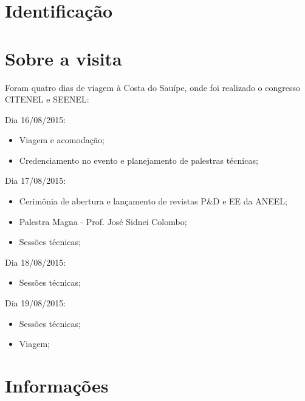 \documentclass[12pt,a4paper]{article}
\begin{document}



\newpage%
\section{Identificação}



\newpage%
\section{Sobre a visita}
Foram quatro dias de viagem à Costa do Sauípe, onde foi realizado o congresso
CITENEL e SEENEL:

Dia 16/08/2015:
\begin{itemize}
  \item Viagem e acomodação;
  \item Credenciamento no evento e planejamento de palestras técnicas;
\end{itemize}

Dia 17/08/2015:
\begin{itemize}
  \item Cerimônia de abertura e lançamento de revistas P\&D e EE da ANEEL;
  \item Palestra Magna - Prof. José Sidnei Colombo;
  \item Sessões técnicas;
\end{itemize}

Dia 18/08/2015:
\begin{itemize}
  \item Sessões técnicas;
\end{itemize}

Dia 19/08/2015:
\begin{itemize}
  \item Sessões técnicas;
  \item Viagem;
\end{itemize}

\section{Informações}
\end{document}
